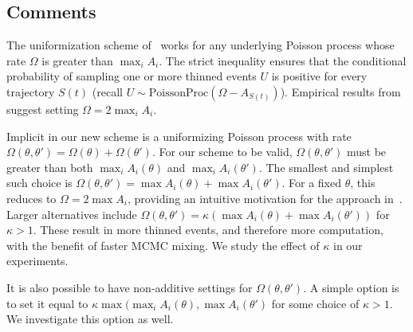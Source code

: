 \subsection{Comments}\label{sec:comments}

The uniformization scheme of~\cite{RaoTeh13} works for any underlying Poisson
process whose rate $\Omega$ is greater than $\max_i A_i$. The strict inequality
ensures that the conditional probability of sampling one or more thinned events 
$U$ is positive for every trajectory $S(t)$ (recall 
$U \sim \text{PoissonProc}(\Omega-A_{S(t)})$). Empirical results from~\cite{RaoTeh13}
suggest setting $\Omega = 2 \max_i A_i$.

Implicit in our new scheme is a uniformizing Poisson process with rate
$\Omega(\theta,\theta') = \Omega(\theta) + \Omega(\theta')$. For our 
scheme to be valid, $\Omega(\theta,\theta')$ must be greater than both
$\max_i A_i(\theta)$ and $\max_i A_i(\theta')$. The smallest and simplest such
choice is $\Omega(\theta,\theta') = \max A_i(\theta) + \max A_i(\theta')$.
For a fixed $\theta$, this reduces to $\Omega = 2\max A_i$, providing
an intuitive motivation for the approach in~\cite{RaoTeh13}.
Larger alternatives include 
$\Omega(\theta,\theta') = \kappa(\max A_i(\theta) + \max A_i(\theta'))$
for $\kappa > 1$.  These result in more thinned events, and therefore more 
computation, with the benefit of faster MCMC mixing. We study the effect of 
$\kappa$ in our experiments.

It is also possible to have non-additive settings for $\Omega(\theta,\theta')$.
A simple option is to set it equal to 
$\kappa \max( \max_i A_i(\theta), \max A_i(\theta')$ for some choice of $\kappa
> 1$. We investigate this option as well.
